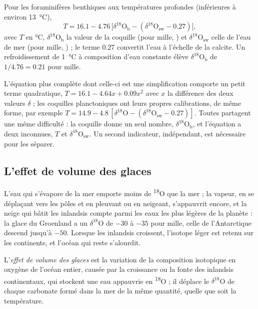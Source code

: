 \begin{proposition}\label{prop:b2:climate-proxies:benthic}
Pour les foraminifères benthiques aux températures profondes (inférieures à environ \qty{13}{\celsius}),
\[
  T = 16.1 - 4.76\,\bigl[\delta^{18}\mathrm{O}_{\mathrm{b}} - (\delta^{18}\mathrm{O}_{\mathrm{sw}} -
  0.27)\bigr],
\]
avec $T$ en \unit{\celsius}, $\delta^{18}\mathrm{O}_{\mathrm{b}}$ la valeur de la coquille (pour mille,
) et $\delta^{18}\mathrm{O}_{\mathrm{sw}}$ celle de l'eau de mer (pour mille, ) ; le terme
0.27 convertit l'eau à l'échelle de la calcite. Un refroidissement de \qty{1}{\celsius} à composition d'eau constante élève
$\delta^{18}\mathrm{O}_{\mathrm{b}}$ de $1/4.76 = 0.21$ pour mille.
\end{proposition}
\admitted

L'équation plus complète dont celle-ci est une simplification comporte un petit terme quadratique,
$T = 16.1 - 4.64x + 0.09x^2$ avec $x$ la différence des deux valeurs $\delta$ ; les coquilles planctoniques
ont leurs propres calibrations, de même forme, par exemple $T = 14.9 - 4.8\,[\delta^{18}\mathrm{O} -
(\delta^{18}\mathrm{O}_{\mathrm{sw}} - 0.27)]$. Toutes partagent une même difficulté : la coquille donne un seul
nombre, $\delta^{18}\mathrm{O}_{\mathrm{b}}$, et l'équation a deux inconnues, $T$ et
$\delta^{18}\mathrm{O}_{\mathrm{sw}}$. Un second indicateur, indépendant, est nécessaire pour les séparer.

\subsection*{L'effet de volume des glaces}

L'eau qui s'évapore de la mer emporte moins de \textsuperscript{18}O que la mer ; la vapeur, en se déplaçant vers
les pôles et en pleuvant ou en neigeant, s'appauvrit encore, et la neige qui bâtit les inlandsis compte parmi
les eaux les plus légères de la planète : la glace du Groenland a un $\delta^{18}$O de $-30$ à $-35$
pour mille, celle de l'Antarctique descend jusqu'à $-50$. Lorsque les inlandsis croissent, l'isotope léger est
retenu sur les continents, et l'océan qui reste s'alourdit.

\begin{definition}\label{def:b2:climate-proxies:ice-volume}
L'\emph{effet de volume des glaces} est la variation de la composition isotopique en oxygène
de l'océan entier, causée par la croissance ou la fonte des inlandsis continentaux, qui stockent une eau appauvrie
en \textsuperscript{18}O ; il déplace le $\delta^{18}$O de chaque carbonate formé dans la mer de la même quantité,
quelle que soit la température.
\end{definition}


